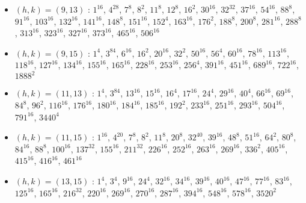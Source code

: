 \begin{itemize}
\item $(h,k)=(9,13)$ : $1^{16}$, $4^{28}$, $7^{8}$, $8^{2}$, $11^{8}$, $12^{8}$, $16^{2}$, $30^{16}$, $32^{32}$, $37^{16}$, $54^{16}$, $88^{8}$, $91^{16}$, $103^{16}$, $132^{16}$, $141^{16}$, $148^{8}$, $151^{16}$, $152^{4}$, $163^{16}$, $176^{2}$, $188^{8}$, $200^{8}$, $281^{16}$, $288^{8}$, $313^{16}$, $323^{16}$, $327^{16}$, $373^{16}$, $465^{16}$, $506^{16}$
\item $(h,k)=(9,15)$ : $1^{4}$, $3^{84}$, $6^{16}$, $16^{2}$, $20^{16}$, $32^{2}$, $50^{16}$, $56^{4}$, $60^{16}$, $78^{16}$, $113^{16}$, $118^{16}$, $127^{16}$, $134^{16}$, $155^{16}$, $165^{16}$, $228^{16}$, $253^{16}$, $256^{4}$, $391^{16}$, $451^{16}$, $689^{16}$, $722^{16}$, $1888^{2}$
\item $(h,k)=(11,13)$ : $1^{4}$, $3^{84}$, $13^{16}$, $15^{16}$, $16^{4}$, $17^{16}$, $24^{4}$, $29^{16}$, $40^{4}$, $66^{16}$, $69^{16}$, $84^{8}$, $96^{2}$, $116^{16}$, $176^{16}$, $180^{16}$, $184^{16}$, $185^{16}$, $192^{2}$, $233^{16}$, $251^{16}$, $293^{16}$, $504^{16}$, $791^{16}$, $3440^{4}$
\item $(h,k)=(11,15)$ : $1^{16}$, $4^{20}$, $7^{8}$, $8^{2}$, $11^{8}$, $20^{8}$, $32^{40}$, $39^{16}$, $48^{8}$, $51^{16}$, $64^{2}$, $80^{8}$, $84^{16}$, $88^{8}$, $100^{16}$, $137^{32}$, $155^{16}$, $211^{32}$, $226^{16}$, $252^{16}$, $263^{16}$, $269^{16}$, $336^{2}$, $405^{16}$, $415^{16}$, $416^{16}$, $461^{16}$
\item $(h,k)=(13,15)$ : $1^{4}$, $3^{4}$, $9^{16}$, $24^{4}$, $32^{16}$, $34^{16}$, $39^{16}$, $40^{16}$, $47^{16}$, $77^{16}$, $83^{16}$, $125^{16}$, $165^{16}$, $216^{32}$, $220^{16}$, $269^{16}$, $270^{16}$, $287^{16}$, $394^{16}$, $548^{16}$, $578^{16}$, $3520^{2}$
\end{itemize}
